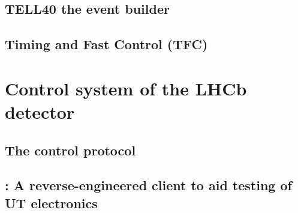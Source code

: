 \subsection{TELL40 the event builder}


\subsection{Timing and Fast Control (TFC)}


\section{Control system of the LHCb detector}
\label{ref:ut:ctrl}


\subsection{The \dim control protocol}


\subsection{\nanoDAQ: A reverse-engineered \dim client to aid testing of UT electronics}
